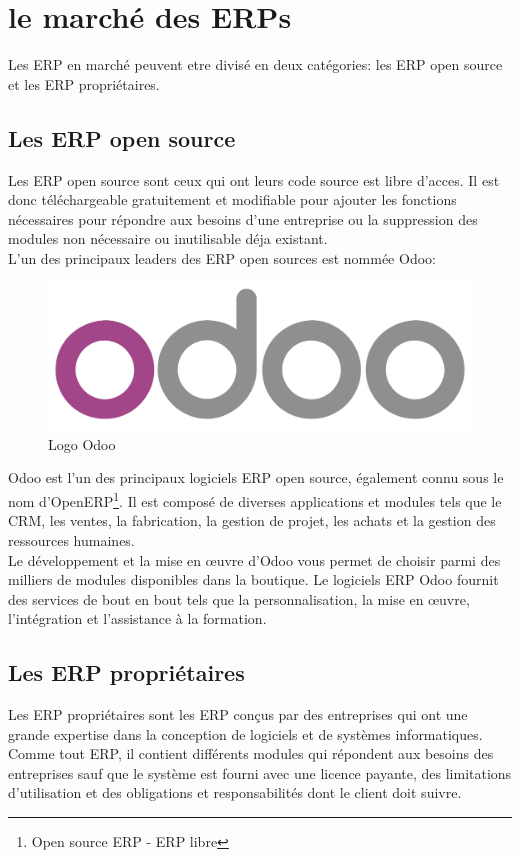 \section{le marché des \acs{ERP}s}
Les \acs{ERP} en marché peuvent etre divisé en deux catégories: les \acs{ERP} open source et les \acs{ERP} propriétaires.

    \subsection{Les \acs{ERP} open source}
    Les \acs{ERP} open source sont ceux qui ont leurs code source est libre d'acces. Il est donc téléchargeable gratuitement et modifiable pour ajouter les fonctions nécessaires pour répondre aux besoins d'une entreprise ou la suppression des modules non nécessaire ou inutilisable déja existant.\\

    L'un des principaux leaders des \acs{ERP} open sources est nommée Odoo:

    \begin{figure}[H]
        \centering
        \includegraphics[scale=0.1]{ERP/Odoo_logo.png}
        \caption{Logo Odoo}
    \end{figure} 

    Odoo\cite{odoo} est l'un des principaux logiciels \acs{ERP} open source, également connu sous le nom d'OpenERP\footnote{Open source \acs{ERP} - \acs{ERP} libre}. Il est composé de diverses applications et modules tels que le CRM, les ventes, la fabrication, la gestion de projet, les achats et la gestion des ressources humaines.\\

    Le développement et la mise en œuvre d'Odoo vous permet de choisir parmi des milliers de modules disponibles dans la boutique. Le logiciels \acs{ERP} Odoo fournit des services de bout en bout tels que la personnalisation, la mise en œuvre, l'intégration et l'assistance à la formation.\\

    \subsection{Les \acs{ERP} propriétaires}
    Les \acs{ERP} propriétaires sont les \acs{ERP} conçus par des entreprises qui ont une grande expertise dans la conception de logiciels et de systèmes informatiques. Comme tout \acs{ERP}, il contient différents modules qui répondent aux besoins des entreprises sauf que le système est fourni avec une licence payante, des limitations d'utilisation et des obligations et responsabilités dont le client doit suivre.\\
    
